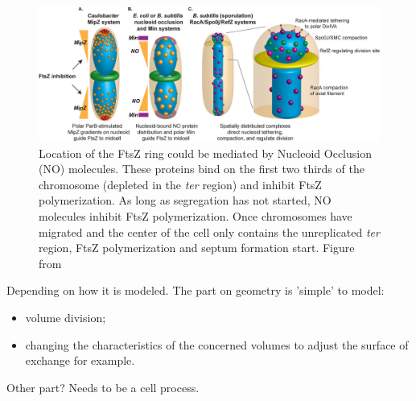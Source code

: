 
\begin{figure}[!ht]
	\centering
	\includegraphics[width=0.9\linewidth]{figure/cytokinesis}
	\caption{Location of the FtsZ ring could be mediated by Nucleoid Occlusion (NO) molecules. These proteins bind on the first two thirds of the chromosome (depleted in the \textit{ter} region) and inhibit FtsZ polymerization. As long as segregation has not started, NO molecules inhibit FtsZ polymerization. Once chromosomes have migrated and the center of the cell only contains the unreplicated \textit{ter} region, FtsZ polymerization and septum formation start. Figure from \citet{ptacin_chromosome_2013}}
	\label{fig:cytokinesis}
\end{figure}

\textcolor[rgb]{1.00,0.00,0.00}{Depending on how it is modeled. The part on geometry is 'simple' to model:
\begin{itemize}
  \item volume division;
  \item changing the characteristics of the concerned volumes to adjust the surface of exchange for example.
\end{itemize}
Other part? Needs to be a cell process.}
